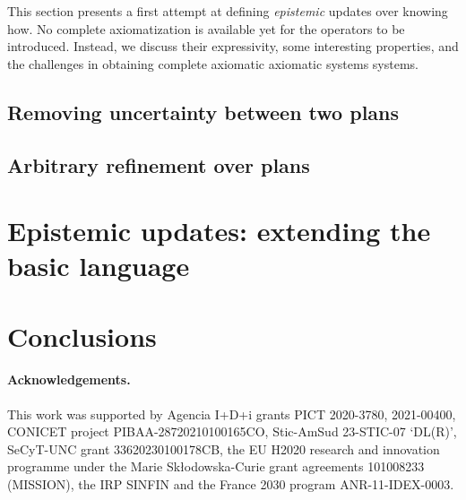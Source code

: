 \documentclass[sn-mathphys-num]{sn-jnl}%
\begin{document}
This section presents a first attempt at defining \emph{epistemic} updates over knowing how.  No complete axiomatization is available yet for the operators to be introduced. Instead, we  discuss their expressivity, some interesting properties, and the challenges in obtaining complete axiomatic axiomatic systems systems. 

\subsection{Removing uncertainty between two plans}
\label{sec:ref}


\subsection{Arbitrary refinement over plans}
\label{sec:aref}


% 

\section{Epistemic updates: extending the basic language}
\label{sec:extension}









% 



% 

\section{Conclusions}
\label{sec:final}


\paragraph{Acknowledgements.} 
This work was supported by Agencia I+D+i grants
 PICT 2020-3780,
 2021-00400, CONICET project PIBAA-28720210100165CO, 
 Stic-AmSud 23-STIC-07 ‘DL(R)', 
 SeCyT-UNC grant 33620230100178CB, 
 the EU
H2020 research and innovation programme under the
Marie Skłodowska-Curie grant agreements 101008233
(MISSION), the IRP SINFIN
and the France 2030 program ANR-11-IDEX-0003.
\end{document}
